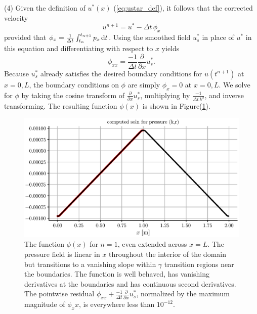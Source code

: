 \documentclass{jfm}
\begin{document}
\noindent(4) Given the definition of $u^*(x)$ (\ref{eq:ustar_def}), it follows  that  the corrected velocity $$u^{n+1} = u^* - \Delta t \, \phi_x$$ provided that $\phi_x = \frac{1}{\Delta t} \int_{t_n}^{t_{n+1}} p_x \, {\rm d}t$. Using the smoothed field $u_s^*$ in place of $u^*$ in this equation and differentiating  with respect to $x$ yields $$\phi_{xx} = \frac{-1}{\Delta t}\frac{\partial}{\partial x} u_s^*.$$ Because $u_s^*$ already satisfies the desired boundary conditions for $u(t^{n+1})$ at $x=0,L$, the boundary conditions on $\phi$ are simply $\phi_x=0$ at $x=0,L$. We solve for $\phi$ by taking the cosine transform of $ \frac{\partial}{\partial x} u_s^*$, multiplying by $\frac{-1}{\Delta t \, k^2}$, and inverse transforming. The resulting function $\phi(x)$ is  shown in Figure(\ref{fig:psoln}).
 \begin{figure}
  \centerline{\includegraphics[width=1.0\textwidth]{FIGS/explicit_1step/p_soln.eps}}
  \caption{The function $\phi(x)$ for $n=1$, even extended across $x=L$. The pressure field is linear in $x$ throughout the interior of the domain but transitions to a vanishing slope within $\gamma$ transition regions near the boundaries.
  The function is well behaved, has vanishing derivatives at the boundaries and has continuous second derivatives. The  pointwise residual $\phi_{xx} +\frac{-1}{\Delta t}\frac{\partial}{\partial x} u_s^* $, normalized by the maximum magnitude of $\phi_xx$,
  is everywhere less than $10^{-12}$.
   }
  \label{fig:psoln}
\end{figure}
\vspace{24pt}
\end{document}
